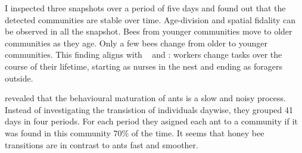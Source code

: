 I inspected three snapshots over a period of five days and found out that the detected communities are stable over time. Age-division and spatial fidality can be observed in all the snapshot.
Bees from younger communities move to older communities as they age. Only a few bees change from older to younger communities.
This finding aligns with ~\textcite{seeley1982adaptive} and \textcite{johnson2008within}: workers change tasks over the course of their lifetime, starting as nurses in the nest and ending as foragers outside.

\textcite{mersch2013tracking} revealed that the behavioural maturation of ants is a slow and noisy process. Instead of investigating the transistion of individuals daywise, they grouped 41 days in four periods. For each period they asigned each ant to a community if it was found in this community 70\% of the time.
It seems that honey bee transitions are in contrast to ants fast and smoother.